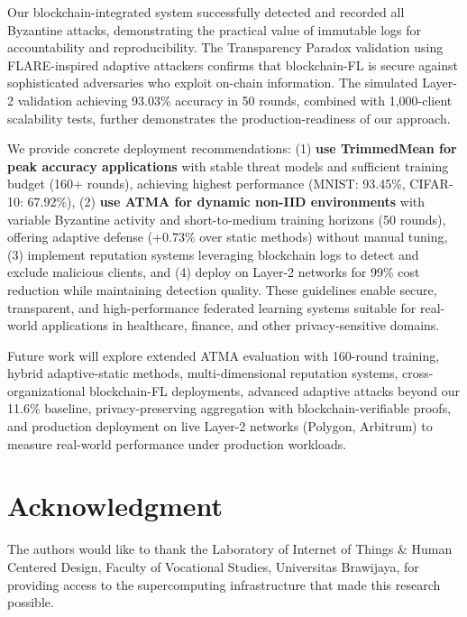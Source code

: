 \documentclass{ieeeaccess}
\begin{document}
Our blockchain-integrated system successfully detected and recorded all Byzantine attacks, demonstrating the practical value of immutable logs for accountability and reproducibility. The Transparency Paradox validation using FLARE-inspired adaptive attackers confirms that blockchain-FL is secure against sophisticated adversaries who exploit on-chain information. The simulated Layer-2 validation achieving 93.03\% accuracy in 50 rounds, combined with 1,000-client scalability tests, further demonstrates the production-readiness of our approach.

We provide concrete deployment recommendations: (1) \textbf{use TrimmedMean for peak accuracy applications} with stable threat models and sufficient training budget (160+ rounds), achieving highest performance (MNIST: 93.45\%, CIFAR-10: 67.92\%), (2) \textbf{use ATMA for dynamic non-IID environments} with variable Byzantine activity and short-to-medium training horizons (50 rounds), offering adaptive defense (+0.73\% over static methods) without manual tuning, (3) implement reputation systems leveraging blockchain logs to detect and exclude malicious clients, and (4) deploy on Layer-2 networks for 99\% cost reduction while maintaining detection quality. These guidelines enable secure, transparent, and high-performance federated learning systems suitable for real-world applications in healthcare, finance, and other privacy-sensitive domains.

Future work will explore extended ATMA evaluation with 160-round training, hybrid adaptive-static methods, multi-dimensional reputation systems, cross-organizational blockchain-FL deployments, advanced adaptive attacks beyond our 11.6\% baseline, privacy-preserving aggregation with blockchain-verifiable proofs, and production deployment on live Layer-2 networks (Polygon, Arbitrum) to measure real-world performance under production workloads.

\section*{Acknowledgment}

The authors would like to thank the Laboratory of Internet of Things \& Human Centered Design, Faculty of Vocational Studies, Universitas Brawijaya, for providing access to the supercomputing infrastructure that made this research possible.
\end{document}
